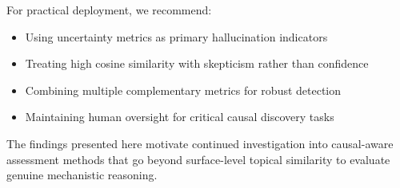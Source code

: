 For practical deployment, we recommend:
\begin{itemize}
    \item Using uncertainty metrics as primary hallucination indicators
    \item Treating high cosine similarity with skepticism rather than confidence
    \item Combining multiple complementary metrics for robust detection
    \item Maintaining human oversight for critical causal discovery tasks
\end{itemize}

The findings presented here motivate continued investigation into causal-aware assessment methods that go beyond surface-level topical similarity to evaluate genuine mechanistic reasoning.
